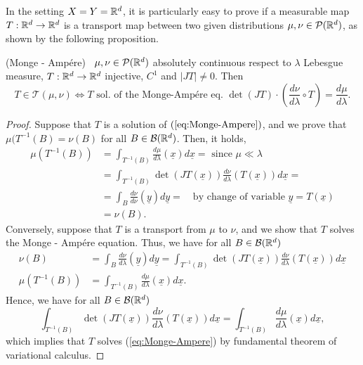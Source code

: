 \documentclass[../main.tex]{subfiles}
\begin{document}
In the setting $X = Y = \mathbb{R}^d$, it is particularly easy to prove if a measurable map $T: \mathbb{R}^d \to \mathbb{R}^d$ is a transport map between two given distributions $\mu, \nu\in\mathcal{P}(\mathbb{R}^d)$, as shown by the following proposition.
\begin{proposition} (Monge - Amp\'ere) \ 
    $\mu, \nu\in\mathcal{P}(\mathbb{R}^d)$ absolutely continuous respect to $\lambda$ Lebesgue measure, $T: \mathbb{R}^d \to \mathbb{R}^d$ injective, $C^1$ and $\mid JT \mid \neq 0$. Then
    \begin{equation}
    \label{eq:Monge-Ampere}
    T\in\mathcal{T}(\mu, \nu) \iff T \text{ sol.\ of the Monge-Amp\'ere eq.\ } \det(JT)\cdot \left(\frac{d\nu}{d\lambda} \circ T\right) = \frac{d\mu}{d\lambda}.
    \end{equation}
\end{proposition}
\begin{proof}
    Suppose that $T$ is a solution of $(\ref{eq:Monge-Ampere})$, and we prove that $\mu(T^{-1}(B)=\nu(B)$ for all $B\in\mathcal{B}(\mathbb{R}^d)$.
    Then, it holds, 
    \begin{align*}
        \mu(T^{-1}(B)) &= \int_{T^{-1}(B)} \frac{d\mu}{d\lambda}(\underline{x}) d\underline{x} = \text{ since } \mu \ll\lambda \\
        &= \int_{T^{-1}(B)} \det(JT(\underline{x}))\frac{d\nu}{d\lambda}(T(\underline{x})) d\underline{x} = \\
        &= \int_B \frac{d\nu}{d\nu}(\underline{y}) d\underline{y}= \quad \text{by change of variable } \underline{y} = T(\underline{x}) \\ 
        &= \nu(B).
    \end{align*}
    Conversely, suppose that $T$ is a transport from $\mu$ to $\nu$, and we show that $T$ solves the Monge - Amp\'ere equation. Thus, we have for all $B\in\mathcal{B}(\mathbb{R}^d)$
    \begin{align*}
        \nu(B) &= \int_B \frac{d\nu}{d\lambda}(\underline{y})d\underline{y} = \int_{T^{-1}(B)} \det(JT(\underline{x}))\frac{d\nu}{d\lambda}(T(\underline{x})) d\underline{x} \\
        \mu(T^{-1}(B)) &= \int_{T^{-1}(B)} \frac{d\mu}{d\lambda}(\underline{x}) d\underline{x}.
    \end{align*}
    Hence, we have for all $B\in\mathcal{B}(\mathbb{R}^d)$
    $$
    \int_{T^{-1}(B)} \det(JT(\underline{x}))\frac{d\nu}{d\lambda}(T(\underline{x})) d\underline{x}
    = \int_{T^{-1}(B)} \frac{d\mu}{d\lambda}(\underline{x}) d\underline{x},
    $$
    which implies that $T$ solves (\ref{eq:Monge-Ampere}) by fundamental theorem of variational calculus.
\end{proof}
\end{document}
